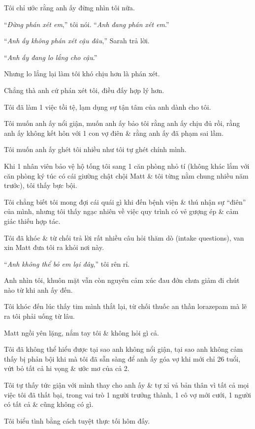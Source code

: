 \documentclass{article}
\begin{document}
Tôi chỉ ước rằng anh ấy đừng nhìn tôi nữa.

%
``\textit{Đừng phán xét em},'' tôi nói. ``\textit{Anh đang phán xét em}.''

%
``\textit{Anh ấy không phán xét cậu đâu},'' Sarah trả lời.

``\textit{Anh ấy đang lo lắng cho cậu}.''

%
Nhưng lo lắng lại làm tôi khó chịu hơn là phán xét.

Chẳng thà anh cứ phán xét tôi, điều đấy hợp lý hơn.

Tôi đã làm 1 việc tồi tệ, lạm dụng sự tận tâm của anh dành cho tôi.

Tôi muốn anh ấy nổi giận, muốn anh ấy bảo tôi rằng anh ấy chịu đủ rồi, rằng anh ấy không kết hôn với 1 con vợ điên \& rằng anh ấy đã phạm sai lầm.

Tôi muốn anh ấy ghét tôi nhiều như tôi tự ghét chính mình.

%
Khi 1 nhân viên bảo vệ hộ tống tôi sang 1 căn phòng nhỏ tí (không khác lắm với căn phòng ký túc có cái giường chật chội Matt \& tôi từng nằm chung nhiều năm trước), tôi thấy bực bội.

Tôi chẳng biết tôi mong đợi cái quái gì khi đến bệnh viện \& thú nhận sự ``điên'' của mình, nhưng tôi thấy ngạc nhiên về việc quy trình có vẻ gượng ép \& cảm giác thiếu hợp tác.

Tôi đã khóc \& từ chối trả lời rất nhiều câu hỏi thăm dò (intake questions), van xin Matt đưa tôi ra khỏi nơi này.

%
``\textit{Anh không thể bỏ em lại đây},'' tôi rên rỉ.

%
Anh nhìn tôi, khuôn mặt vẫn còn nguyên cảm xúc đau đớn chưa giảm đi chút nào từ khi anh ấy đến.

%
Tôi khóc đến lúc thấy tim mình thắt lại, từ chối thuốc an thần lorazepam mà lẽ ra tôi phải uống từ lâu.

Matt ngồi yên lặng, nắm tay tôi \& không hỏi gì cả.

%
Tôi đã không thể hiểu được tại sao anh không nổi giận, tại sao anh không cảm thấy bị phản bội khi mà tôi đã sẵn sàng để anh ấy góa vợ khi mới chỉ 26 tuổi, vứt bỏ tất cả hi vọng \& ước mơ của cả 2.

Tôi tự thấy tức giận với mình thay cho anh ấy \& tự xỉ vả bản thân vì tất cả mọi việc tôi đã thất bại, trong vai trò 1 người trưởng thành, 1 cô vợ mới cưới, 1 người có tất cả \& cũng không có gì.

Tôi biểu tình bằng cách tuyệt thực tối hôm đấy.
\end{document}
